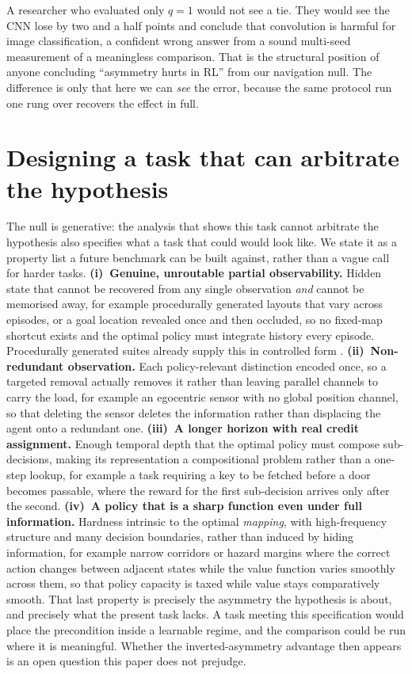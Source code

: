 \documentclass{article}
\begin{document}
A researcher who evaluated only $q=1$ would not see a tie. They would see the
CNN lose by two and a half points and conclude that convolution is harmful for image
classification, a confident wrong answer from a sound multi-seed measurement of a meaningless
comparison. That is the structural position of anyone concluding ``asymmetry hurts in RL''
from our navigation null. The difference is only that here we can \emph{see} the error,
because the same protocol run one rung over recovers the effect in full.

\section{Designing a task that can arbitrate the hypothesis}
\label{sec:need}

The null is generative: the analysis that shows this task cannot arbitrate the hypothesis also
specifies what a task that could would look like. We state it as a property list a future
benchmark can be built against, rather than a vague call for harder tasks.
\textbf{(i)~Genuine, unroutable partial observability.} Hidden state that cannot be recovered
from any single observation \emph{and} cannot be memorised away, for example procedurally
generated layouts that vary across episodes, or a goal location revealed once and then
occluded, so no fixed-map shortcut exists and the optimal policy must integrate history every
episode. Procedurally generated suites already supply this in controlled form
\citep{cobbe2020procgen,chevalier2023minigrid}.
\textbf{(ii)~Non-redundant observation.} Each policy-relevant distinction encoded once, so a
targeted removal actually removes it rather than leaving parallel channels to carry the load,
for example an egocentric sensor with no global position channel, so that deleting the sensor
deletes the information rather than displacing the agent onto a redundant one.
\textbf{(iii)~A longer horizon with real credit assignment.} Enough temporal depth that the
optimal policy must compose sub-decisions, making its representation a compositional problem
rather than a one-step lookup, for example a task requiring a key to be fetched before a door
becomes passable, where the reward for the first sub-decision arrives only after the second.
\textbf{(iv)~A policy that is a sharp function even under full information.} Hardness intrinsic
to the optimal \emph{mapping}, with high-frequency structure and many decision boundaries,
rather than induced by hiding information, for example narrow corridors or hazard margins
where the correct action changes between adjacent states while the value function varies
smoothly across them, so that policy capacity is taxed while value stays comparatively smooth.
That last property is precisely the asymmetry the hypothesis is about, and precisely what the
present task lacks. A task meeting this specification would place the precondition inside a
learnable regime, and the comparison could be run where it is meaningful. Whether the
inverted-asymmetry advantage then appears is an open question this paper does not prejudge.
\end{document}
